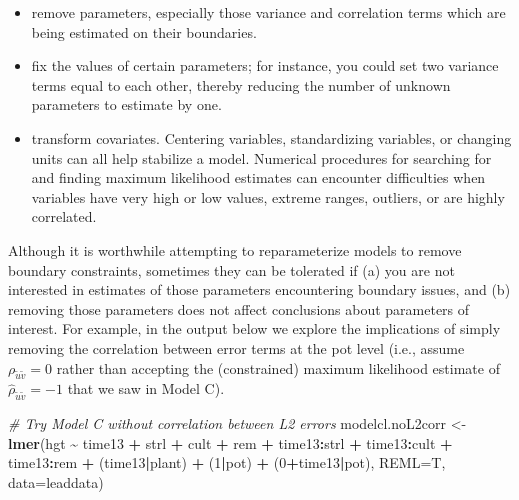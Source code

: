 \documentclass[
]{krantz}
\newenvironment{Shaded}{\begin{snugshade}}{\end{snugshade}}
\newcommand{\AttributeTok}[1]{\textcolor[rgb]{0.27,0.27,0.27}{#1}}
\newcommand{\CommentTok}[1]{\textcolor[rgb]{0.37,0.37,0.37}{\textit{#1}}}
\newcommand{\DecValTok}[1]{\textcolor[rgb]{0.06,0.06,0.06}{#1}}
\newcommand{\FunctionTok}[1]{\textcolor[rgb]{0.27,0.27,0.27}{\textbf{#1}}}
\newcommand{\NormalTok}[1]{#1}
\newcommand{\OtherTok}[1]{\textcolor[rgb]{0.37,0.37,0.37}{#1}}
\newcommand{\SpecialCharTok}[1]{\textcolor[rgb]{0.43,0.43,0.43}{\textbf{#1}}}
\providecommand{\tightlist}{%
  \setlength{\itemsep}{0pt}\setlength{\parskip}{0pt}}
\begin{document}
\begin{itemize}
\tightlist
\item
  remove parameters, especially those variance and correlation terms which are being estimated on their boundaries.
\item
  fix the values of certain parameters; for instance, you could set two variance terms equal to each other, thereby reducing the number of unknown parameters to estimate by one.
\item
  transform covariates. Centering variables, standardizing variables, or changing units can all help stabilize a model. Numerical procedures for searching for and finding maximum likelihood estimates can encounter difficulties when variables have very high or low values, extreme ranges, outliers, or are highly correlated.
\end{itemize}

Although it is worthwhile attempting to reparameterize models to remove boundary constraints, sometimes they can be tolerated if (a) you are not interested in estimates of those parameters encountering boundary issues, and (b) removing those parameters does not affect conclusions about parameters of interest. For example, in the output below we explore the implications of simply removing the correlation between error terms at the pot level (i.e., assume \(\rho_{\tilde{u}\tilde{v}}=0\) rather than accepting the (constrained) maximum likelihood estimate of \(\hat{\rho}_{\tilde{u}\tilde{v}}=-1\) that we saw in Model C).

\begin{Shaded}
\begin{Highlighting}[]
\CommentTok{\# Try Model C without correlation between L2 errors}
\NormalTok{modelcl.noL2corr }\OtherTok{\textless{}{-}} \FunctionTok{lmer}\NormalTok{(hgt }\SpecialCharTok{\textasciitilde{}}\NormalTok{ time13 }\SpecialCharTok{+}\NormalTok{ strl }\SpecialCharTok{+}\NormalTok{ cult }\SpecialCharTok{+}\NormalTok{ rem }\SpecialCharTok{+}
\NormalTok{    time13}\SpecialCharTok{:}\NormalTok{strl }\SpecialCharTok{+}\NormalTok{ time13}\SpecialCharTok{:}\NormalTok{cult }\SpecialCharTok{+}\NormalTok{ time13}\SpecialCharTok{:}\NormalTok{rem }\SpecialCharTok{+}\NormalTok{ (time13}\SpecialCharTok{|}\NormalTok{plant) }\SpecialCharTok{+}
\NormalTok{    (}\DecValTok{1}\SpecialCharTok{|}\NormalTok{pot) }\SpecialCharTok{+}\NormalTok{ (}\DecValTok{0}\SpecialCharTok{+}\NormalTok{time13}\SpecialCharTok{|}\NormalTok{pot), }\AttributeTok{REML=}\NormalTok{T, }\AttributeTok{data=}\NormalTok{leaddata)}
\end{Highlighting}
\end{Shaded}
\end{document}
